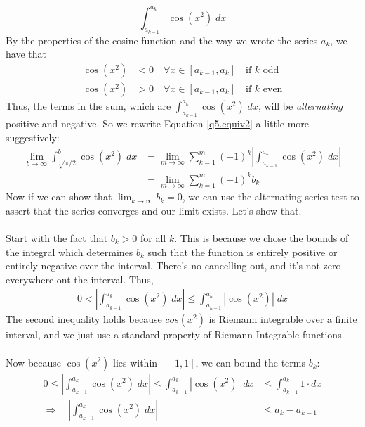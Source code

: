 \documentclass[12pt]{article}
\theoremstyle{plain}
\theoremstyle{definition}
\theoremstyle{remark}
\begin{document}
\begin{enumerate}
\begin{equation}
    \int^{a_k}_{a_{k-1}} \cos(x^2) \; dx  
\end{equation}
By the properties of the cosine function and the way we wrote the series $a_k$, we have that
\begin{align*}
    \cos(x^2) &< 0 \quad \forall x \in [a_{k-1}, a_k] \quad \text{if $k$ odd}\\
    \cos(x^2) &> 0 \quad \forall x \in [a_{k-1}, a_k] \quad \text{if $k$ even}
\end{align*}
Thus, the terms in the sum, which are $\int^{a_k}_{a_{k-1}} \cos(x^2) \; dx$, will be \emph{alternating} positive and negative. So we rewrite Equation \ref{q5.equiv2} a little more suggestively:
\begin{align*}
    \lim_{b\rightarrow\infty} \int^b_{\sqrt{\pi/2}} \cos(x^2) \; dx   &=
    \lim_{m\rightarrow\infty} \sum^m_{k=1} (-1)^k \left\lvert \int^{a_k}_{a_{k-1}} \cos(x^2) \; dx \right\rvert\\
    &=
    \lim_{m\rightarrow\infty} \sum^m_{k=1} (-1)^k b_k
\end{align*}
Now if we can show that $\lim_{k\rightarrow\infty} b_k = 0$, we can use the alternating series test to assert that the series converges and our limit exists. Let's show that.
\\
\\
Start with the fact that $b_k>0$ for all $k$. This is because we chose the bounds of the integral which determines $b_k$ such that the function is entirely positive or entirely negative over the interval.  There's no cancelling out, and it's not zero everywhere ont the interval. Thus,
\begin{align*}
    0 < \left\lvert \int^{a_k}_{a_{k-1}} \cos(x^2) \; dx \right\rvert \leq 
    \int^{a_k}_{a_{k-1}} \left\lvert \cos(x^2)\right\rvert \; dx 
\end{align*}
The second inequality holds because $cos(x^2)$ is Riemann integrable over a finite interval, and we just use a standard property of Riemann Integrable functions.
\\
\\
Now because $\cos(x^2)$ lies within $[-1,1]$, we can bound the terms $b_k$:
\begin{align*}
    0 \leq \left\lvert \int^{a_k}_{a_{k-1}} \cos(x^2) \; dx \right\rvert \leq 
    \int^{a_k}_{a_{k-1}} \left\lvert \cos(x^2)\right\rvert \; dx &\leq 
    \int^{a_k}_{a_{k-1}} 1 \cdot dx \\
    \Rightarrow \quad \left\lvert \int^{a_k}_{a_{k-1}} \cos(x^2) \; dx \right\rvert &\leq a_k - a_{k-1}

\end{align*}
\end{enumerate}
\end{document}
